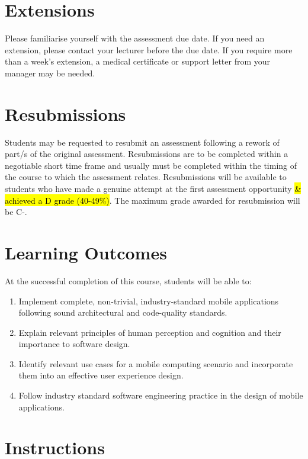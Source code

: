 \documentclass{article}
\begin{document}
\section*{Extensions}
Please familiarise yourself with the assessment due date. If you need an extension, please contact your lecturer before the due date. If you require more than a week's extension, a medical certificate or support letter from your manager may be needed.

\section*{Resubmissions}
Students may be requested to resubmit an assessment following a rework of part/s of the original assessment. Resubmissions are to be completed within a negotiable short time frame and usually must be completed within the timing of the course to which the assessment relates. Resubmissions will be available to students who have made a genuine attempt at the first assessment opportunity \hl{\& achieved a D grade (40-49\%)}. The maximum grade awarded for resubmission will be C-.

\section*{Learning Outcomes}
At the successful completion of this course, students will be able to:
\begin{enumerate}
    \item Implement complete, non-trivial, industry-standard mobile applications following sound architectural and code-quality standards.
    \item Explain relevant principles of human perception and cognition and their importance to software design.
    \item Identify relevant use cases for a mobile computing scenario and incorporate them into an effective user experience design.
    \item Follow industry standard software engineering practice in the design of mobile applications.
\end{enumerate}

\newpage

\section*{Instructions} 
\end{document}
